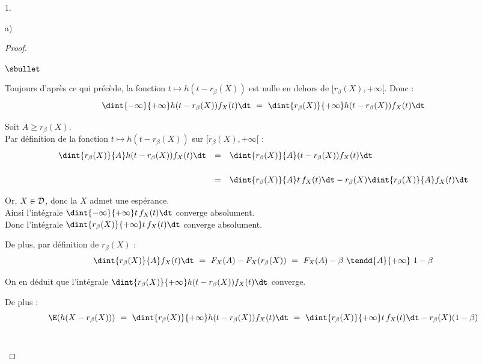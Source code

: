 \documentclass[11pt]{article}%
\begin{document}
\begin{noliste}{1.}
\begin{noliste}{a)}
\begin{proof}
\begin{noliste}{$\sbullet$}
	\item Toujours d'après ce qui précède, la fonction $t \mapsto 
	h(t-r_\beta(X))$ est nulle en dehors de $[r_\beta(X), 
	+\infty[$. Donc :
	\[
	  \dint{-\infty}{+\infty} h(t-r_\beta(X)) f_X(t) \dt \ = \
	  \dint{r_\beta(X)}{+\infty} h(t-r_\beta(X)) f_X(t) \dt
	\]
	
	
	
	
	
	\item Soit $A \geq r_\beta(X)$.\\
	Par définition de la fonction $t\mapsto h(t- r_\beta(X))$ 
	sur $[r_\beta(X), +\infty[$ :
	\[
	  \begin{array}{rcl}
	    \dint{r_\beta(X)}{A} h(t-r_\beta(X)) f_X(t) \dt &=& 
	    \dint{r_\beta(X)}{A} (t-r_\beta(X)) f_X(t) \dt
	    \\[.6cm]
	    &=& \dint{r_\beta(X)}{A} t \, f_X(t) \dt - 
	    r_\beta(X) \dint{r_\beta(X)}{A} f_X(t) \dt
	  \end{array}
	\]
	
	\item Or, $X\in {\cal D}$, donc la \var $X$ admet une 
	espérance.\\[.1cm]
	Ainsi l'intégrale $\dint{-\infty}{+\infty} t \, f_X(t) \dt$
	converge absolument.\\[.1cm]
	Donc l'intégrale $\dint{r_\beta(X)}{+\infty} t\, f_X(t) \dt$
	converge absolument.
	
	\item De plus, par définition de $r_\beta(X)$ :
	\[
	  \dint{r_\beta(X)}{A} f_X(t) \dt \ = \ F_X(A) - F_X(r_\beta(X))
	  \ = \ F_X(A) - \beta \ \tendd{A}{+\infty} \ 1-\beta
	\]
	
	\item On en déduit que l'intégrale $\dint{r_\beta(X)}{+\infty}
	h(t-r_\beta(X)) f_X(t) \dt$ converge.
	
	De plus :
	\[
	  \E(h(X-r_\beta(X))) \ = \
	  \dint{r_\beta(X)}{+\infty} h(t- r_\beta(X)) f_X(t) \dt 
	  \ = \ \dint{r_\beta(X)}{+\infty} t \, f_X(t) \dt - 
	  r_\beta(X) (1-\beta)
	\]
	~\\[-1.4cm]
      \end{noliste}
    \end{proof}


\end{noliste}
\end{noliste}
\end{document}
